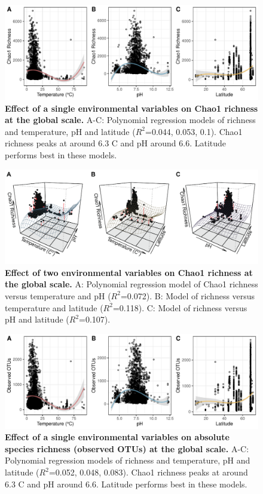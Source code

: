 \begin{figure}[H]
    \centering
    \includegraphics[scale=0.8]{./Figures/Chao_PM_simpleTpL}
    \caption{\textbf{Effect of a single environmental variables on Chao1 richness at the global scale.} A-C: Polynomial regression models of richness and temperature, pH and latitude ($R^{2}$=0.044, 0.053, 0.1). Chao1 richness peaks at around 6.3 \textdegree C and pH around 6.6. Latitude performs best in these models.}
    \label{fig:Chao_PM_simpleTpL}
\end{figure}

\begin{figure}[H]
    \centering
    \includegraphics[scale=0.8]{./Figures/Chao_PM_all_2EVs_3D}
    \caption{\textbf{Effect of two environmental variables on Chao1 richness at the global scale.} A: Polynomial regression model of Chao1 richness versus temperature and pH ($R^{2}$=0.072). B: Model of richness versus temperature and latitude ($R^{2}$=0.118). C: Model of richness versus pH and latitude ($R^{2}$=0.107).}
    \label{fig:Chao_PM_2EVs}
\end{figure}

\begin{figure}[H]
    \centering
    \includegraphics[scale=0.8]{./Figures/OO_PM_simpleTpL}
    \caption{\textbf{Effect of a single environmental variables on absolute species richness (observed OTUs) at the global scale.} A-C: Polynomial regression models of richness and temperature, pH and latitude ($R^{2}$=0.052, 0.048, 0.083). Chao1 richness peaks at around 6.3 \textdegree C and pH around 6.6. Latitude performs best in these models.}
    \label{fig:OO_PM_simpleTpL}
\end{figure}

